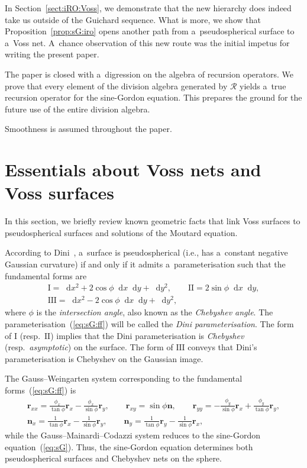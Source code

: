 \documentclass[pdftex]{sigma}
\let\ve\mathbf
\def\eqref#1{{\rm(\ref{#1})}}
\def\dif{\mathop{}\!\mathrm d}
\def\RO{{\mathcal R}}
\numberwithin{equation}{section}
\theoremstyle{definition}
\begin{document}
In Section~\ref{sect:iRO:Voss}, we demonstrate that the new hierarchy
does indeed take us outside of the Guichard sequence.
What is more, we show that Proposition~\ref{prop:sG:iro} opens another
path from a~pseudospherical surface to a~Voss net. A~chance observation of this new route was the initial impetus for writing
the present paper.

The paper is closed with a~digression on the algebra of recursion operators.
We prove that every element of the division algebra generated by $\RO$
yields a~true recursion operator for the sine-Gordon equation.
This prepares the ground for the future use of the entire division algebra.

Smoothness is assumed throughout the paper.


\section{Essentials about Voss nets and Voss surfaces}
\label{sect:Voss}


In this section, we briefly review known geometric facts that link
Voss surfaces to pseudospherical surfaces and solutions of the
Moutard equation.

According to Dini~\cite{UD-1870}, a~surface is pseudospherical (i.e., has a~constant negative Gaussian curvature)
if and only if it admits a~parameterisation such that the fundamental forms are
\begin{gather}
\mathrm{I} = \dif x^2 + 2 \cos \phi \dif x \dif y + \dif y^2,
\qquad
\mathrm{II} = 2 \sin \phi \dif x \dif y,
\nonumber
\\
\mathrm{III} = \dif x^2 - 2 \cos \phi \dif x \dif y + \dif y^2,
\label{eq:sG:ff}
\end{gather}
where $\phi$ is the {\it intersection angle}, also known as the
{\it Chebyshev angle}.
%
The parameterisation~\eqref{eq:sG:ff} will be called
the {\it Dini parameterisation}.
The form of $\mathrm{I}$ (resp.\ $\mathrm{II}$) implies that the Dini
parameterisation is {\it Chebyshev} (resp.\ {\it asymptotic}) on the
surface.
The form of $\mathrm{III}$ conveys that Dini's parameterisation is
Chebyshev on the Gaussian image.

The Gauss--Weingarten system corresponding to the
fundamental forms~\eqref{eq:sG:ff} is
\begin{gather}
\ve r_{xx} = \frac{\phi_x}{\tan \phi} \ve r_x - \frac{\phi_x}{\sin \phi} \ve r_y,
\qquad
\ve r_{xy} = \sin \phi \ve n,
\qquad
\ve r_{yy} = -\frac{\phi_y}{\sin \phi} \ve r_x + \frac{\phi_y}{\tan \phi} \ve r_y,
\nonumber
\\
\ve n_x = \frac{1}{\tan \phi} \ve r_x - \frac{1}{\sin \phi} \ve r_y,
\qquad
\ve n_y = \frac{1}{\tan \phi} \ve r_y - \frac{1}{\sin \phi} \ve r_x,
\label{eq:sG:GW}
\end{gather}
while the Gauss--Mainardi--Codazzi system reduces to the
sine-Gordon equation~\eqref{eq:sG}.
Thus, the sine-Gordon equation determines both pseudospherical
surfaces and Chebyshev nets on the sphere.
\end{document}
